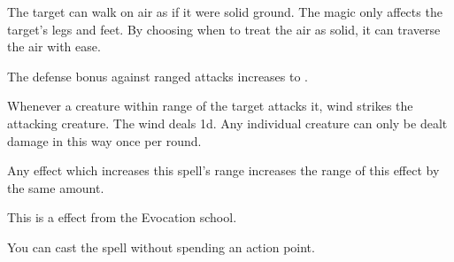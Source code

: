 
The target can walk on air as if it were solid ground.
The magic only affects the target's legs and feet.
By choosing when to treat the air as solid, it can traverse the air with ease.






The defense bonus against ranged attacks increases to .






Whenever a creature within \rngclose range of the target attacks it, wind strikes the attacking creature.
The wind deals  \minus1d.
Any individual creature can only be dealt damage in this way once per round.
\par Any effect which increases this spell's range increases the range of this effect by the same amount.


\par


This is a  effect from the Evocation school.


You can cast the spell without spending an action point.








